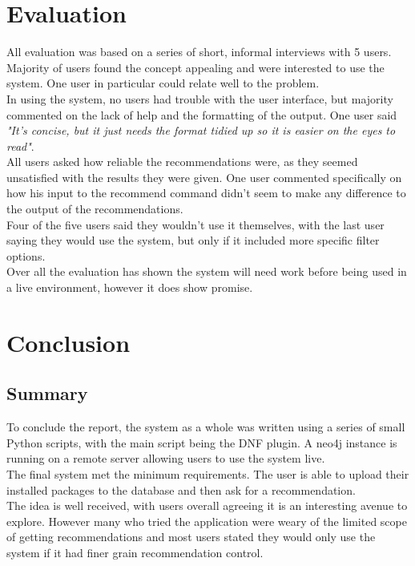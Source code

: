 \documentclass{l4proj}
\begin{document}
 
\chapter{Evaluation}
All evaluation was based on a series of short, informal interviews with 5 users.\\
Majority of users found the concept appealing and were interested to use the system. One user in particular could relate well to the problem.\\
In using the system, no users had trouble with the user interface, but majority commented on the lack of help and the formatting of the output. One user said \emph{"It's concise, but it just needs the format tidied up so it is easier on the eyes to read"}.\\
All users asked how reliable the recommendations were, as they seemed unsatisfied with the results they were given. One user commented specifically on how his input to the recommend command didn't seem to make any difference to the output of the recommendations.\\
Four of the five users said they wouldn't use it themselves, with the last user saying they would use the system, but only if it included more specific filter options.\\
Over all the evaluation has shown the system will need work before being used in a live environment, however it does show promise.
 
 
\chapter{Conclusion}

\section{Summary}
To conclude the report, the system as a whole was written using a series of small Python scripts, with the main script being the DNF plugin. A neo4j instance is running on a remote server allowing users to use the system live.\\
The final system met the minimum requirements. The user is able to upload their installed packages to the database and then ask for a recommendation.\\
The idea is well received, with users overall agreeing it is an interesting avenue to explore. However many who tried the application were weary of the limited scope of getting recommendations and most users stated they would only use the system if it had finer grain recommendation control.
\end{document}
